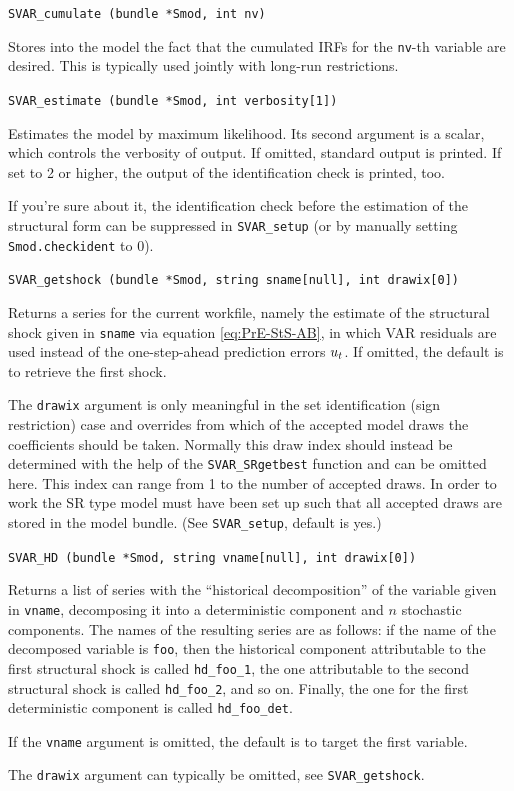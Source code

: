 \documentclass[a4paper,10pt]{article}
\newenvironment{funcdoc}[1]
{\noindent\hrulefill\newline\nopagebreak\texttt{#1}%
\nopagebreak\par\noindent\hrulefill%
\nopagebreak\par\nopagebreak\smallskip\nopagebreak\par}
{\bigskip}
\newcommand{\PrE}[1]{\ensuremath u_{#1}} %
\begin{document}
\begin{funcdoc}{SVAR\_cumulate (bundle *Smod, int nv)}
  \noindent Stores into the model the fact that the cumulated IRFs for
  the \texttt{nv}-th variable are desired. This is typically used jointly
  with long-run restrictions.
\end{funcdoc}

\begin{funcdoc}{SVAR\_estimate (bundle *Smod, int verbosity[1])}
  \noindent Estimates the model by maximum likelihood. Its second argument is a
  scalar, which controls the verbosity of output. If omitted,
  standard output is printed. If set to 2 or higher, the output of the 
  identification check is printed, too.
  
  If you're sure about it, the identification check before
  the estimation of the structural form can be suppressed in 
  \texttt{SVAR\_setup} (or by manually setting \texttt{Smod.checkident}
  to 0).
\end{funcdoc}

\begin{funcdoc}{SVAR\_getshock (bundle *Smod, string sname[null], int drawix[0])}
  \noindent Returns a series for the current workfile, namely the estimate of the 
  structural shock given in \texttt{sname} via equation \eqref{eq:PrE-StS-AB}, 
  in which VAR residuals are used instead of the one-step-ahead prediction errors
  $\PrE{t}$. If omitted, the default is to retrieve the first shock.
  
  The \texttt{drawix} argument is only meaningful in the set identification 
  (sign restriction) case and overrides from which of the accepted model draws 
  the coefficients should be taken. Normally this draw index should instead be determined 
  with the help of the \texttt{SVAR\_SRgetbest} function and can be omitted here. 
  This index can range from 1 to the number
  of accepted draws. In order to work the SR type model must have been set up such that all
  accepted draws are stored in the model bundle. (See \texttt{SVAR\_setup},
  default is yes.)
\end{funcdoc}

\begin{funcdoc}{SVAR\_HD (bundle *Smod, string vname[null], int drawix[0])}
  \noindent Returns a list of series with 
  the ``historical decomposition'' of the variable given in \texttt{vname},
  decomposing it into a deterministic component
  and $n$ stochastic components. The names of the resulting series are
  as follows: if the name of the decomposed variable is \texttt{foo},
  then the historical component attributable to the first structural
  shock is called \texttt{hd\_foo\_1}, the one attributable to the
  second structural shock is called \texttt{hd\_foo\_2}, and so
  on. Finally, the one for the first deterministic component is called
  \texttt{hd\_foo\_det}.
  
  If the \texttt{vname} argument is omitted, the default is to target the first variable.
  
  The \texttt{drawix} argument can typically be omitted, see \texttt{SVAR\_getshock}.
\end{funcdoc}
\end{document}

